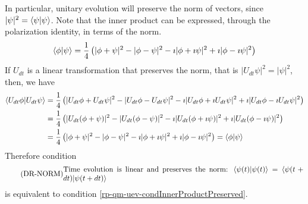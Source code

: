 In particular, unitary evolution will preserve the norm of vectors, since $|\psi|^2 = \langle\psi | \psi \rangle$. Note that the inner product can be expressed, through the polarization identity, in terms of the norm.
\begin{equation}
	\begin{aligned}
		\langle \phi | \psi \rangle = \frac{1}{4}\left( |\phi + \psi|^2 - |\phi - \psi|^2 - \imath |\phi + \imath \psi|^2 +\imath |\phi - \imath \psi|^2 \right)
	\end{aligned}
\end{equation}
If $U_{dt}$ is a linear transformation that preserves the norm, that is $|U_{dt} \psi | ^2 = | \psi |^2$, then, we have
\begin{equation}
	\begin{aligned}
		\langle U_{dt} \phi | U_{dt} \psi \rangle &= \frac{1}{4}\left( |U_{dt}\phi + U_{dt}\psi|^2 - |U_{dt}\phi - U_{dt}\psi|^2 - \imath |U_{dt}\phi + \imath U_{dt}\psi|^2 +\imath |U_{dt}\phi - \imath U_{dt}\psi|^2 \right) \\
		&= \frac{1}{4}\left( |U_{dt}(\phi + \psi)|^2 - |U_{dt}(\phi - \psi)|^2 - \imath |U_{dt}(\phi + \imath \psi)|^2 +\imath |U_{dt}(\phi - \imath \psi)|^2 \right) \\
		&= \frac{1}{4}\left( |\phi + \psi|^2 - |\phi - \psi|^2 - \imath |\phi + \imath \psi|^2 +\imath |\phi - \imath \psi|^2 \right) =  \langle \phi | \psi \rangle 
	\end{aligned}
\end{equation}
Therefore condition
\begin{equation}\label{rp-qm-uev-condNormalized}
	\tag{DR-NORM}
	\eqtext{Time evolution is linear and preserves the norm: $\< \psi(t) | \psi(t) \> = \< \psi(t+dt) | \psi(t+dt) \>$} 
\end{equation}
is equivalent to condition \ref{rp-qm-uev-condInnerProductPreserved}.


